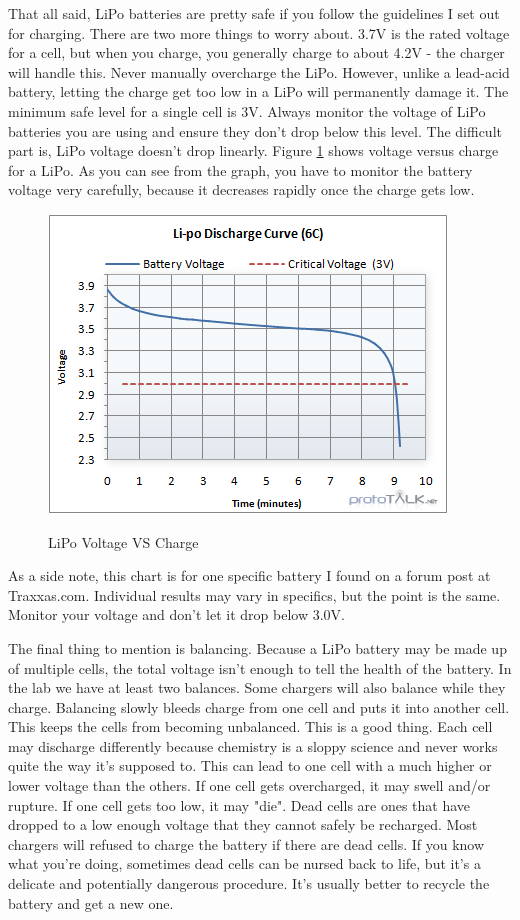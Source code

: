 That all said, LiPo batteries are pretty safe if you follow the guidelines I set out for charging. There are two more things to worry about. 3.7V is the rated voltage for a cell, but when you charge, you generally charge to about 4.2V - the charger will handle this. Never manually overcharge the LiPo. However, unlike a lead-acid battery, letting the charge get too low in a LiPo will permanently damage it. The minimum safe level for a single cell is 3V. Always monitor the voltage of LiPo batteries you are using and ensure they don't drop below this level. The difficult part is, LiPo voltage doesn't drop linearly. Figure \ref{fig:lipovoltage} shows voltage versus charge for a LiPo. As you can see from the graph, you have to monitor the battery voltage very carefully, because it decreases rapidly once the charge gets low.

\begin{figure}[h]
\centering
\includegraphics[scale=0.75]{lipovoltage.png}
\label{fig:lipovoltage}
\caption{LiPo Voltage VS Charge}
\end{figure}

As a side note, this chart is for one specific battery I found on a forum post at Traxxas.com. Individual results may vary in specifics, but the point is the same. Monitor your voltage and don't let it drop below 3.0V.

The final thing to mention is balancing. Because a LiPo battery may be made up of multiple cells, the total voltage isn't enough to tell the health of the battery. In the lab we have at least two balances. Some chargers will also balance while they charge. Balancing slowly bleeds charge from one cell and puts it into another cell. This keeps the cells from becoming unbalanced. This is a good thing. Each cell may discharge differently because chemistry is a sloppy science and never works quite the way it's supposed to. This can lead to one cell with a much higher or lower voltage than the others. If one cell gets overcharged, it may swell and/or rupture. If one cell gets too low, it may "die". Dead cells are ones that have dropped to a low enough voltage that they cannot safely be recharged. Most chargers will refused to charge the battery if there are dead cells. If you know what you're doing, sometimes dead cells can be nursed back to life, but it's a delicate and potentially dangerous procedure. It's usually better to recycle the battery and get a new one.

